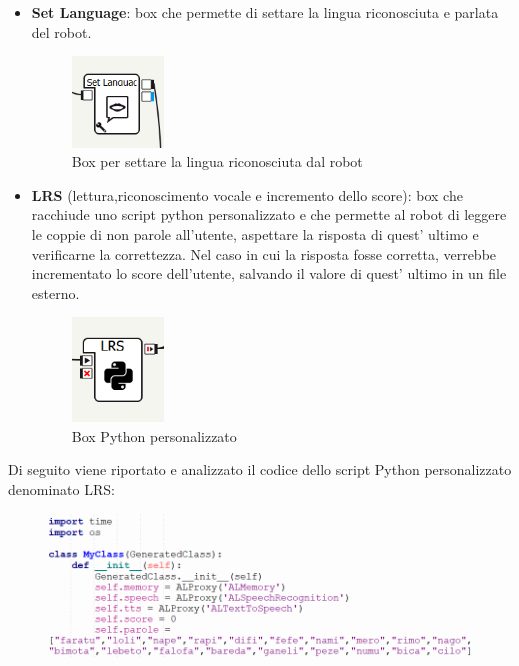 \begin{sloppypar}
{\begin{itemize}
\begin{figure}[H]
\caption{Box per il tracciamento del volto umano}
\end{figure}
\vspace{0.3cm}      
    \item \textbf{Set Language}: box che permette di settare la lingua riconosciuta e parlata
del robot.
\vspace{0.1cm}
\begin{figure}[H]
\centering
\includegraphics[width=0.23\textwidth]{immagini/Language.png}
\caption{Box per settare la lingua riconosciuta dal robot}
\end{figure}
\vspace{0.3cm}       
    \item \textbf{LRS} (lettura,riconoscimento vocale e incremento dello score): box che
racchiude uno script python personalizzato e che permette al robot di leggere le
coppie di non parole all’utente, aspettare la risposta di quest’ ultimo e verificarne
la correttezza. Nel caso in cui la risposta fosse corretta, verrebbe incrementato lo
score dell’utente, salvando il valore di quest’ ultimo in un file esterno.
\vspace{0.1cm}
\begin{figure}[H]
\centering
\includegraphics[width=0.23\textwidth]{immagini/LRS.png}
\caption{Box Python personalizzato}
\end{figure}
\vspace{0.3cm} 
\end{itemize}
Di seguito viene riportato e analizzato il codice dello script Python personalizzato denominato
LRS:
\begin{figure}[H]
\centering
\includegraphics[width=1\textwidth]{immagini/lrs1.png}

\end{figure}}
\end{sloppypar}
